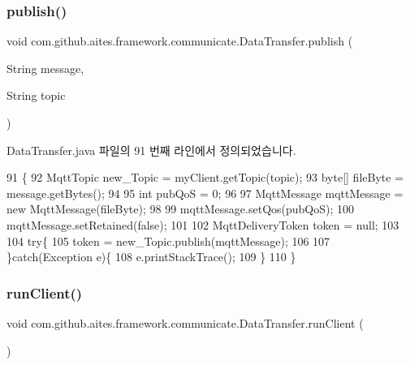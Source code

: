 \subsubsection{\texorpdfstring{publish()}{publish()}\hspace{0.1cm}{\footnotesize\ttfamily [2/2]}}
{\footnotesize\ttfamily void com.\+github.\+aites.\+framework.\+communicate.\+Data\+Transfer.\+publish (\begin{DoxyParamCaption}\item[{String}]{message,  }\item[{String}]{topic }\end{DoxyParamCaption})}



Data\+Transfer.\+java 파일의 91 번째 라인에서 정의되었습니다.


\begin{DoxyCode}
91                                                      \{
92         MqttTopic new\_Topic = myClient.getTopic(topic);
93         byte[] fileByte = message.getBytes();
94                 
95         \textcolor{keywordtype}{int} pubQoS = 0; 
96         
97         MqttMessage mqttMessage = \textcolor{keyword}{new} MqttMessage(fileByte);
98         
99         mqttMessage.setQos(pubQoS);
100         mqttMessage.setRetained(\textcolor{keyword}{false});
101         
102         MqttDeliveryToken token = null;
103         
104         \textcolor{keywordflow}{try}\{
105             token = new\_Topic.publish(mqttMessage); 
106             
107         \}\textcolor{keywordflow}{catch}(Exception e)\{
108             e.printStackTrace();
109         \}
110     \}
\end{DoxyCode}
\mbox{\label{classcom_1_1github_1_1aites_1_1framework_1_1communicate_1_1_data_transfer_a17b21e4cd10c17d048a6c78dd8128981}} 
\subsubsection{\texorpdfstring{run\+Client()}{runClient()}}
{\footnotesize\ttfamily void com.\+github.\+aites.\+framework.\+communicate.\+Data\+Transfer.\+run\+Client (\begin{DoxyParamCaption}{ }\end{DoxyParamCaption})}



